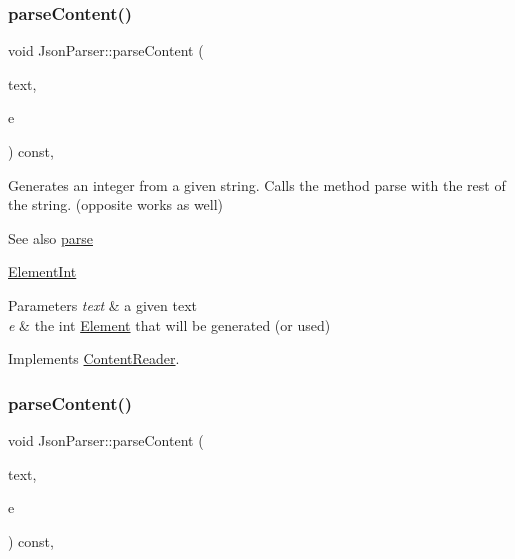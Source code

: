 \subsubsection{\texorpdfstring{parse\+Content()}{parseContent()}\hspace{0.1cm}{\footnotesize\ttfamily [1/6]}}
{\footnotesize\ttfamily void Json\+Parser\+::parse\+Content (\begin{DoxyParamCaption}\item[{std\+::string \&}]{text,  }\item[{\mbox{\hyperlink{classElementInt}{Element\+Int}} $\ast$}]{e }\end{DoxyParamCaption}) const\hspace{0.3cm}{\ttfamily [override]}, {\ttfamily [virtual]}}

Generates an integer from a given string. Calls the method parse with the rest of the string. (opposite works as well) \begin{DoxySeeAlso}{See also}
\mbox{\hyperlink{classJsonParser_a3ec3a9fcc8a63f987b4749d60b0568df}{parse}} 

\mbox{\hyperlink{classElementInt}{Element\+Int}}
\end{DoxySeeAlso}

\begin{DoxyParams}{Parameters}
{\em text} & a given text \\
\hline
{\em e} & the int \mbox{\hyperlink{classElement}{Element}} that will be generated (or used) \\
\hline
\end{DoxyParams}


Implements \mbox{\hyperlink{classContentReader_a7eef37b8b9761e21c0a3907ff94c72f7}{Content\+Reader}}.

\mbox{\label{classJsonParser_a94737a7518f05e4ed43a753f4148b354}} 
\subsubsection{\texorpdfstring{parse\+Content()}{parseContent()}\hspace{0.1cm}{\footnotesize\ttfamily [2/6]}}
{\footnotesize\ttfamily void Json\+Parser\+::parse\+Content (\begin{DoxyParamCaption}\item[{std\+::string \&}]{text,  }\item[{\mbox{\hyperlink{classElementString}{Element\+String}} $\ast$}]{e }\end{DoxyParamCaption}) const\hspace{0.3cm}{\ttfamily [override]}, {\ttfamily [virtual]}}

